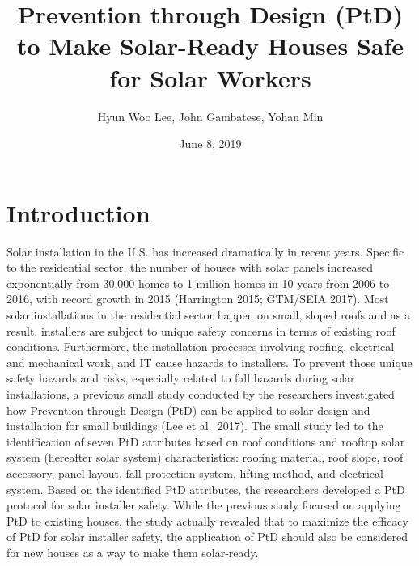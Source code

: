 \documentclass[]{article}
\title{Prevention through Design (PtD) to Make Solar-Ready Houses Safe for
Solar Workers}
\author{Hyun Woo Lee, John Gambatese, Yohan Min}
\date{June 8, 2019}
\begin{document}
\maketitle

\hypertarget{introduction}{%
\section{Introduction}\label{introduction}}

Solar installation in the U.S. has increased dramatically in recent
years. Specific to the residential sector, the number of houses with
solar panels increased exponentially from 30,000 homes to 1 million
homes in 10 years from 2006 to 2016, with record growth in 2015
(Harrington 2015; GTM/SEIA 2017). Most solar installations in the
residential sector happen on small, sloped roofs and as a result,
installers are subject to unique safety concerns in terms of existing
roof conditions. Furthermore, the installation processes involving
roofing, electrical and mechanical work, and IT cause hazards to
installers. To prevent those unique safety hazards and risks, especially
related to fall hazards during solar installations, a previous small
study conducted by the researchers investigated how Prevention through
Design (PtD) can be applied to solar design and installation for small
buildings (Lee et al.~2017). The small study led to the identification
of seven PtD attributes based on roof conditions and rooftop solar
system (hereafter solar system) characteristics: roofing material, roof
slope, roof accessory, panel layout, fall protection system, lifting
method, and electrical system. Based on the identified PtD attributes,
the researchers developed a PtD protocol for solar installer safety.
While the previous study focused on applying PtD to existing houses, the
study actually revealed that to maximize the efficacy of PtD for solar
installer safety, the application of PtD should also be considered for
new houses as a way to make them solar-ready.
\end{document}
